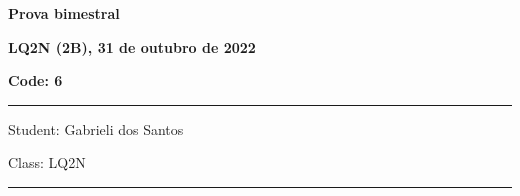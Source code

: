 \documentclass[12pt, addpoints]{exam}
\begin{document}
        \begin{minipage}[b]{0.75\linewidth}
            \begin{flushleft}
                {\bf \large Prova bimestral}
            \end{flushleft}
            \begin{flushleft}
                {\bf \large LQ2N (2B), 31 de outubro de 2022}
            \end{flushleft}
        \end{minipage}
        \begin{minipage}[b]{0.20\linewidth}
            \begin{flushright}
                {\bf \large Code: 6}
            \end{flushright}
        \end{minipage}
        \vspace{0.5cm} \hrule \vspace{0.5cm}
        \begin{minipage}{0.75\linewidth}
            \begin{flushleft}
                Student: Gabrieli dos Santos
            \end{flushleft}
        \end{minipage}
        \begin{minipage}{0.20\linewidth}
            \begin{flushright}
                Class: LQ2N
            \end{flushright}
        \end{minipage}
        \vspace{0.5cm} \hrule \vspace{0.5cm}
\end{document}
